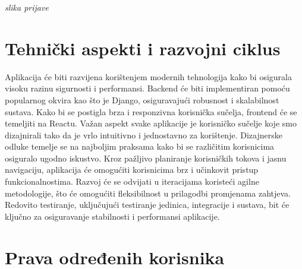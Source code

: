 		\textit{slika prijave}
		
		\section{Tehnički aspekti i razvojni ciklus}

		Aplikacija  će biti razvijena korištenjem modernih tehnologija kako bi osigurala visoku razinu sigurnosti i performansi. Backend će biti implementiran pomoću popularnog okvira kao što je Django, osiguravajući robusnost i skalabilnost sustava. Kako bi se postigla brza i responzivna korisnička sučelja, frontend će se temeljiti na Reactu.
		Važan aspekt svake aplikacije je korisničko sučelje koje smo dizajnirali tako da je vrlo intuitivno i jednostavno za korištenje. 
		Dizajnerske odluke temelje se na najboljim praksama kako bi se različitim korisnicima osiguralo ugodno iskustvo.
		Kroz pažljivo planiranje korisničkih tokova i jasnu navigaciju, aplikacija će omogućiti korisnicima brz i učinkovit pristup funkcionalnostima.
		Razvoj će se odvijati u iteracijama koristeći agilne metodologije, što će omogućiti fleksibilnost u prilagodbi promjenama zahtjeva. Redovito testiranje, uključujući testiranje jedinica, integracije i sustava, bit će ključno za osiguravanje stabilnosti i performansi aplikacije.
		
		\section{Prava određenih korisnika}
		
